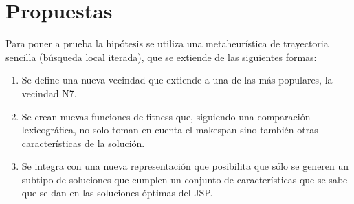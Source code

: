 \section{Propuestas}
Para poner a prueba la hipótesis se utiliza una metaheurística de trayectoria sencilla (búsqueda local iterada), que se
extiende de las siguientes formas:
\begin{enumerate}
	\item Se define una nueva vecindad que extiende a una de las más populares, la vecindad N7.
	\item Se crean nuevas funciones de fitness que, siguiendo una comparación lexicográfica, no solo toman en cuenta el makespan 
	sino también otras características de la solución.
	\item Se integra con una nueva representación que posibilita que sólo se generen un subtipo de soluciones que cumplen un conjunto de 
	características que se sabe que se dan en las soluciones óptimas del JSP.
\end{enumerate}
